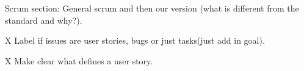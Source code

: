 Scrum section: General scrum and then our version (what is different from the standard and why?).

X Label if issues are user stories, bugs or just tasks(just add in goal).

X Make clear what defines a user story.

